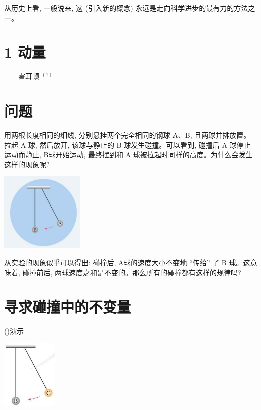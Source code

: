 \documentclass[10pt]{article}
\begin{document}
从历史上看, 一般说来, 这 (引入新的概念) 永远是走向科学进步的最有力的方法之一。

\section*{1 动量}

——霍耳顿 \({}^{\left( 1\right) }\)

\section*{问题}

用两根长度相同的细线, 分别悬挂两个完全相同的钢球 A、B, 且两球并排放置。拉起 A 球, 然后放开, 该球与静止的 B 球发生碰撞。可以看到, 碰撞后 A 球停止运动而静止, B球开始运动, 最终摆到和 \(\mathrm{A}\) 球被拉起时同样的高度。为什么会发生这样的现象呢?

\begin{center}
\includegraphics[max width=0.3\textwidth]{images/01910e4c-ebb8-7d2c-8f2f-2375bc1d2d12_7_343494.jpg}
\end{center}

从实验的现象似乎可以得出: 碰撞后, A球的速度大小不变地 “传给” 了 B 球。这意味着, 碰撞前后, 两球速度之和是不变的。那么所有的碰撞都有这样的规律吗?

\section*{寻求碰撞中的不变量}

()演示

\begin{center}
\includegraphics[max width=0.2\textwidth]{images/01910e4c-ebb8-7d2c-8f2f-2375bc1d2d12_7_178300.jpg}
\end{center}
\end{document}
